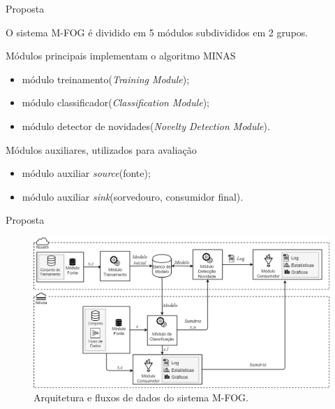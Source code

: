 \documentclass[aspectratio=43,10pt]{beamer}
\newcommand{\mfog}{sistema M-FOG\xspace}
\begin{document}
\newcommand{\source}{módulo auxiliar \textit{source}\xspace}
\newcommand{\sink}{módulo auxiliar \textit{sink}\xspace}

\newcommand{\offline}{módulo treinamento\xspace}
\newcommand{\classify}{módulo classificador\xspace}
\newcommand{\detector}{módulo detector de novidades\xspace}

\begin{frame}[fragile]{Proposta}

  O \mfog é dividido em 5 módulos subdivididos em 2 grupos.
  
  \begin{alertblock}{Módulos principais implementam o algoritmo MINAS}
    \begin{itemize}
      \item \offline (\textit{Training Module});
      \item \classify (\textit{Classification Module});
      \item \detector (\textit{Novelty Detection Module}).
    \end{itemize}
  \end{alertblock}
  \begin{alertblock}{Módulos auxiliares, utilizados para avaliação}
    \begin{itemize}
      \item \source (fonte);
      \item \sink (sorvedouro, consumidor final).
    \end{itemize}
  \end{alertblock}
\end{frame}

\begin{frame}[fragile]{Proposta}
  \vspace{-0.5cm}
  \begin{figure}[h]
    \centering
    \hspace*{-0.9cm}
    \includegraphics[width=1.1\textwidth]{../figuras/mfog-arch-v3_pt-br.png}
    \caption{Arquitetura e fluxos de dados do \mfog.}
    \label{fig:arch}
  \end{figure}
\end{frame}
\end{document}
